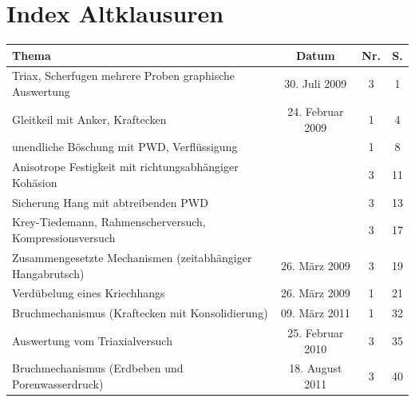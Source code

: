 \documentclass[fleqn,twoside]{article}
\begin{document}

\newpage

\section{Index Altklausuren}

\begin{table}[hbt!]
\fontsize{9pt}{8pt}\selectfont
\begin{tabular}{@{}|l|c|c|c|@{}}
\toprule
\textbf{Thema}                                             & \textbf{Datum}   & \textbf{Nr.} & \textbf{S.} \\ \midrule
Triax, Scherfugen mehrere Proben graphische Auswertung     & 30. Juli 2009    & 3            & 1           \\ \midrule
Gleitkeil mit Anker, Kraftecken                            & 24. Februar 2009 & 1            & 4           \\ \midrule
unendliche Böschung mit PWD, Verflüssigung                 &                  & 1            & 8           \\ \midrule
Anisotrope Festigkeit mit richtungsabhängiger Kohäsion     &                  & 3            & 11          \\ \midrule
Sicherung Hang mit abtreibenden PWD                        &                  & 3            & 13          \\ \midrule
Krey-Tiedemann, Rahmenscherversuch, Kompressionsversuch    &                  & 3            & 17          \\ \midrule
Zusammengesetzte Mechanismen (zeitabhängiger Hangabrutsch) & 26. März 2009    & 3            & 19          \\ \midrule
Verdübelung eines Kriechhangs                              & 26. März 2009    & 1            & 21          \\ \midrule
Bruchmechanismus (Kraftecken mit Konsolidierung)           & 09. März 2011    & 1            & 32          \\ \midrule
Auswertung vom Triaxialversuch                             & 25. Februar 2010 & 3            & 35          \\ \midrule
Bruchmechanismus (Erdbeben und Porenwasserdruck)           & 18. August 2011  & 3            & 40          \\ \midrule

\end{tabular}
\end{table}
\end{document}
